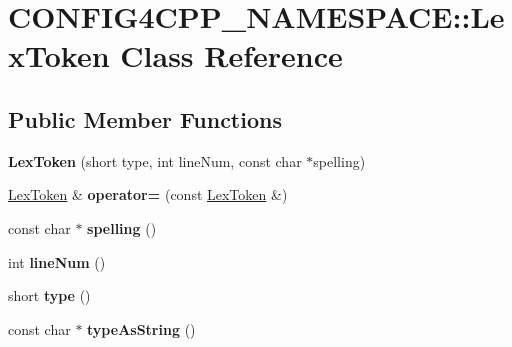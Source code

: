 \hypertarget{classCONFIG4CPP__NAMESPACE_1_1LexToken}{\section{C\-O\-N\-F\-I\-G4\-C\-P\-P\-\_\-\-N\-A\-M\-E\-S\-P\-A\-C\-E\-:\-:Lex\-Token Class Reference}
\label{classCONFIG4CPP__NAMESPACE_1_1LexToken}
}
\subsection*{Public Member Functions}
\begin{DoxyCompactItemize}
\item 
\hypertarget{classCONFIG4CPP__NAMESPACE_1_1LexToken_af1d9d8abe647268f458c3e124747e666}{{\bfseries Lex\-Token} (short type, int line\-Num, const char $\ast$spelling)}\label{classCONFIG4CPP__NAMESPACE_1_1LexToken_af1d9d8abe647268f458c3e124747e666}

\item 
\hypertarget{classCONFIG4CPP__NAMESPACE_1_1LexToken_aace473bdcc35b8d51724339db4fa1947}{\hyperlink{classCONFIG4CPP__NAMESPACE_1_1LexToken}{Lex\-Token} \& {\bfseries operator=} (const \hyperlink{classCONFIG4CPP__NAMESPACE_1_1LexToken}{Lex\-Token} \&)}\label{classCONFIG4CPP__NAMESPACE_1_1LexToken_aace473bdcc35b8d51724339db4fa1947}

\item 
\hypertarget{classCONFIG4CPP__NAMESPACE_1_1LexToken_a7764a580ff45dbf380ae257a83fa07c6}{const char $\ast$ {\bfseries spelling} ()}\label{classCONFIG4CPP__NAMESPACE_1_1LexToken_a7764a580ff45dbf380ae257a83fa07c6}

\item 
\hypertarget{classCONFIG4CPP__NAMESPACE_1_1LexToken_a88ee70c3f2fed1da0c33c1f545529f68}{int {\bfseries line\-Num} ()}\label{classCONFIG4CPP__NAMESPACE_1_1LexToken_a88ee70c3f2fed1da0c33c1f545529f68}

\item 
\hypertarget{classCONFIG4CPP__NAMESPACE_1_1LexToken_a227c5c3959085e10b18983b207d87ed4}{short {\bfseries type} ()}\label{classCONFIG4CPP__NAMESPACE_1_1LexToken_a227c5c3959085e10b18983b207d87ed4}

\item 
\hypertarget{classCONFIG4CPP__NAMESPACE_1_1LexToken_a53adb4319a8b16db1fb7c208cfef506a}{const char $\ast$ {\bfseries type\-As\-String} ()}\label{classCONFIG4CPP__NAMESPACE_1_1LexToken_a53adb4319a8b16db1fb7c208cfef506a}


\end{DoxyCompactItemize}
